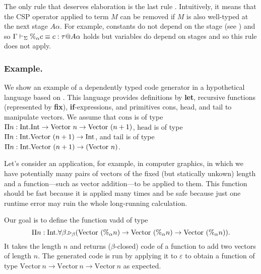 The only rule that deserves elaboration is the last rule \QPercent.
Intuitively, it means that the CSP operator applied to term $M$ can be
removed if $M$ is also well-typed at the next stage \(A\alpha\).
For example, constants do not depend on the stage (see \TConst) and
so \(\Gamma\vdash_\Sigma \%_\alpha c \equiv c : \tau @ A\alpha\) holds but variables
do depend on stages and so this rule does not apply.

\subsubsection{Example.}

We show an example of a dependently typed code generator in a
hypothetical language based on \LTP.  
This language provides definitions by \textbf{let},
recursive functions (represented by \textbf{fix}), \textbf{if}-expressions,
and primitives cons, head, and tail to manipulate vectors. We assume that
$\text{cons}$ is of type $\Pi n:\textrm{Int}.\textrm{Int} \to \text{Vector}\ n \to \text{Vector}\ (n+1)$, 
$\text{head}$ is of type $\Pi n:\textrm{Int}.\text{Vector}\ (n+1) \to \textrm{Int}$, and
$\text{tail}$ is of type $\Pi n:\textrm{Int}.\text{Vector}\ (n+1) \to (\text{Vector}\ n)$.

Let's consider an application, for example, in computer graphics, in which we
have potentially many pairs of vectors of the fixed (but statically unkown)
length and a function---such as vector addition---to be applied to
them. This function should be fast because it is applied many times and be
safe because just one runtime error may ruin the whole long-running calculation.


\newcommand{\Vpn}{\text{Vector}\ (\%_\alpha n)}

Our goal is to define the function vadd of type
\[
  \Pi n:\I.\F\beta.\TW_\beta(\Vpn\to\Vpn\to\Vpn).
\]
\renewcommand{\Vpn}{\text{Vector}\ n}
It takes the length $n$ and returns ($\beta$-closed) code of a
function to add two vectors of length $n$.  The generated
code is run by applying it to \(\varepsilon\) to obtain
a function of type \(\Vpn\to\Vpn\to\Vpn\) as expected.

